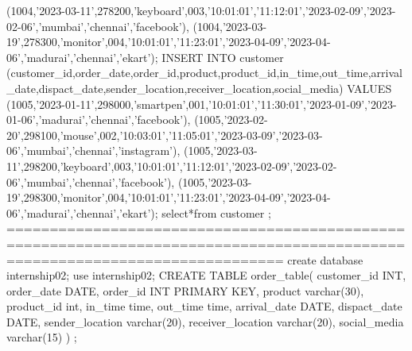 (1004,'2023-03-11',278200,'keyboard',003,'10:01:01','11:12:01','2023-02-09','2023-02-06','mumbai','chennai','facebook'),
(1004,'2023-03-19',278300,'monitor',004,'10:01:01','11:23:01','2023-04-09','2023-04-06','madurai','chennai','ekart');
INSERT INTO customer
(customer_id,order_date,order_id,product,product_id,in_time,out_time,arrival_date,dispact_date,sender_location,receiver_location,social_media) VALUES
(1005,'2023-01-11',298000,'smartpen',001,'10:01:01','11:30:01','2023-01-09','2023-01-06','madurai','chennai','facebook'),
(1005,'2023-02-20',298100,'mouse',002,'10:03:01','11:05:01','2023-03-09','2023-03-06','mumbai','chennai','instagram'),
(1005,'2023-03-11',298200,'keyboard',003,'10:01:01','11:12:01','2023-02-09','2023-02-06','mumbai','chennai','facebook'),
(1005,'2023-03-19',298300,'monitor',004,'10:01:01','11:23:01','2023-04-09','2023-04-06','madurai','chennai','ekart');
select*from customer ;
============================================================================================================================
create database internship02;
use internship02; 
CREATE TABLE order_table(
 customer_id INT,
 order_date DATE,
 order_id INT PRIMARY KEY,
 product varchar(30),
 product_id int,
 in_time time,
 out_time time,
 arrival_date DATE,
 dispact_date DATE,
 sender_location varchar(20),
 receiver_location varchar(20),
 social_media varchar(15) 
 ) ;
 
